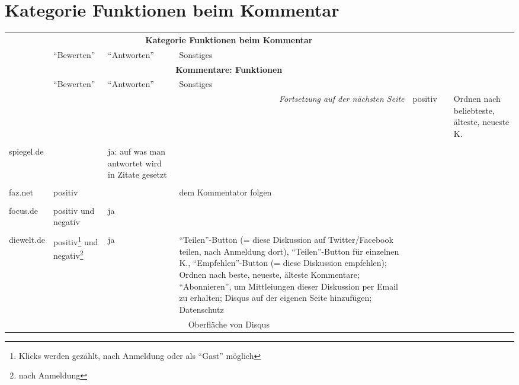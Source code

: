 \section{Kategorie Funktionen beim Kommentar}

\begin{landscape} \footnotesize
  \begin{longtable}{l|p{40mm}p{40mm}p{80mm}}

  & \multicolumn{3}{c}{\bfseries Kategorie Funktionen beim Kommentar} \\
  & ``Bewerten'' & ``Antworten'' & Sonstiges \\\hline
  \endfirsthead

  & \multicolumn{3}{c}{\bfseries Kommentare: Funktionen} \\
  & ``Bewerten'' & ``Antworten'' & Sonstiges \\\hline
  \endhead

  \hline \multicolumn{4}{r}{\emph{Fortsetzung auf der nächsten Seite}}
  \endfoot

  \hline
  \endlastfoot


\hline

  bild.de &
    positiv & & Ordnen nach beliebteste, älteste, neueste K.\\
    & \multicolumn{3}{c}{}\\\hline

  spiegel.de &
  & ja: auf was man antwortet wird in Zitate gesetzt & \\
  & \multicolumn{3}{c}{}\\\hline

  faz.net & positiv & & dem Kommentator folgen \\
          & \multicolumn{3}{c}{}\\\hline

  focus.de & positiv und negativ & ja & \\
           & \multicolumn{3}{c}{}\\\hline

  diewelt.de &
    positiv\footnote{Klicks werden gezählt, nach Anmeldung oder als ``Gast'' möglich}
    und negativ\footnote{nach Anmeldung} &
    ja &
    ``Teilen''-Button (= diese Diskussion auf Twitter/Facebook teilen, nach
    Anmeldung dort), ``Teilen''-Button für einzelnen K., ``Empfehlen''-Button (=
    diese Diskussion empfehlen); Ordnen nach beste, neueste, älteste Kommentare;
    ``Abonnieren'', um Mittleiungen dieser Diskussion per Email zu erhalten;
    Disqus auf der eigenen Seite hinzufügen; Datenschutz\\
    & \multicolumn{3}{c}{Oberfläche von Disqus}\\\hline


\end{longtable}
\end{landscape}
